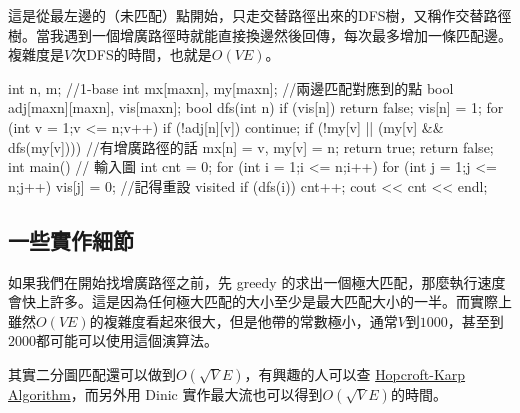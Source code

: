 \documentclass[main.tex]{subfiles}
\begin{document}
這是從最左邊的（未匹配）點開始，只走交替路徑出來的DFS樹，又稱作交替路徑樹。當我遇到一個增廣路徑時就能直接換邊然後回傳，每次最多增加一條匹配邊。複雜度是$V$次DFS的時間，也就是$O(VE)$。
\begin{C++}
int n, m; //1-base
int mx[maxn], my[maxn]; //兩邊匹配對應到的點
bool adj[maxn][maxn], vis[maxn];
bool dfs(int n) {
	if (vis[n]) return false;
	vis[n] = 1;
	for (int v = 1;v <= n;v++) {
		if (!adj[n][v]) continue;
		if (!my[v] || (my[v] && dfs(my[v]))) { //有增廣路徑的話
			mx[n] = v, my[v] = n;
			return true;
		}
	}
	return false;
}
int main() {
	// 輸入圖
	int cnt = 0;
	for (int i = 1;i <= n;i++) {
		for (int j = 1;j <= n;j++) vis[j] = 0; //記得重設 visited
		if (dfs(i)) {
			cnt++;
		}
	}
    cout << cnt << endl;
}
\end{C++}
\subsection{一些實作細節}
\par 如果我們在開始找增廣路徑之前，先 greedy 的求出一個極大匹配，那麼執行速度會快上許多。這是因為任何極大匹配的大小至少是最大匹配大小的一半。而實際上雖然$O(VE)$的複雜度看起來很大，但是他帶的常數極小，通常$V$到$1000$，甚至到$2000$都可能可以使用這個演算法。

\par 其實二分圖匹配還可以做到$O(\sqrt{V} E)$，有興趣的人可以查 \href{https://en.wikipedia.org/wiki/Hopcroft-Karp_algorithm}{Hopcroft-Karp Algorithm}，而另外用 Dinic 實作最大流也可以得到$O(\sqrt{V} E)$的時間。
\end{document}
